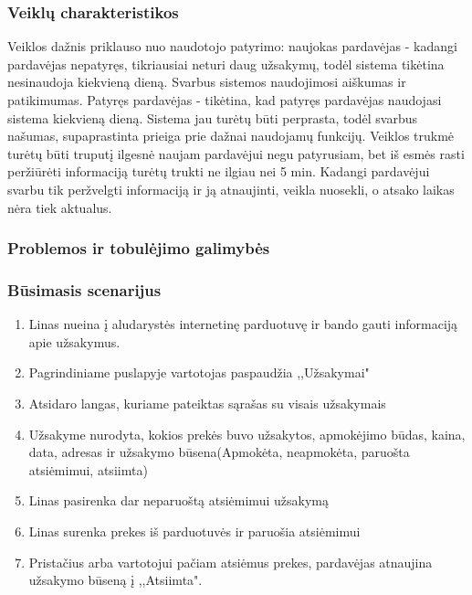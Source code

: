 \documentclass[oneside]{VUMIFPSkursinis}
\begin{document}
		\subsubsection{Veiklų charakteristikos}
			Veiklos dažnis priklauso nuo naudotojo patyrimo: naujokas pardavėjas - kadangi pardavėjas nepatyręs, tikriausiai neturi daug užsakymų, todėl sistema tikėtina nesinaudoja kiekvieną dieną. Svarbus sistemos naudojimosi aiškumas ir patikimumas. Patyręs pardavėjas - tikėtina, kad patyręs pardavėjas naudojasi sistema kiekvieną dieną. Sistema jau turėtų būti perprasta, todėl svarbus našumas, supaprastinta prieiga prie dažnai naudojamų funkcijų.
			Veiklos trukmė turėtų būti truputį ilgesnė naujam pardavėjui negu patyrusiam, bet iš esmės rasti peržiūrėti informaciją turėtų trukti ne ilgiau nei 5 min.
			Kadangi pardavėjui svarbu tik peržvelgti informaciją ir ją atnaujinti, veikla nuosekli, o atsako laikas nėra tiek aktualus.

		\subsubsection{Problemos ir tobulėjimo galimybės}
		\subsubsection{Būsimasis scenarijus}
			\begin{enumerate}
				\item{Linas nueina į aludarystės internetinę parduotuvę ir bando gauti informaciją apie užsakymus.}
				\item{Pagrindiniame puslapyje vartotojas paspaudžia ,,Užsakymai"}
				\item{Atsidaro langas, kuriame pateiktas sąrašas su visais užsakymais}
				\item{Užsakyme nurodyta, kokios prekės buvo užsakytos, apmokėjimo būdas, kaina, data, adresas ir užsakymo būsena(Apmokėta, neapmokėta, paruošta atsiėmimui, atsiimta)}
				\item{Linas pasirenka dar neparuoštą atsiėmimui užsakymą}
				\item{Linas surenka prekes iš parduotuvės ir paruošia atsiėmimui}
				\item{Pristačius arba vartotojui pačiam atsiėmus prekes, pardavėjas atnaujina užsakymo būseną į ,,Atsiimta".}
				\end{enumerate}
\end{document}
